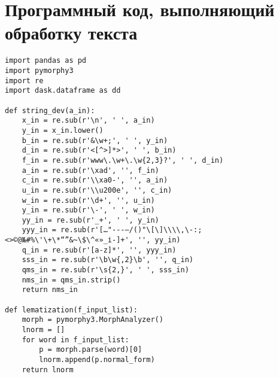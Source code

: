 \documentclass[coursework]{SCWorks}
\begin{document}
\section{Программный код, выполняющий обработку текста}
\label{apx:tokenization}
\begin{verbatim}
import pandas as pd
import pymorphy3
import re
import dask.dataframe as dd

def string_dev(a_in):
    x_in = re.sub(r'\n', ' ', a_in)
    y_in = x_in.lower()
    b_in = re.sub(r'&\w+;', ' ', y_in)
    d_in = re.sub(r'<[^>]*>', ' ', b_in)
    f_in = re.sub(r'www\.\w+\.\w{2,3}?', ' ', d_in)
    a_in = re.sub(r'\xad', '', f_in)
    c_in = re.sub(r'\\xa0-', '', a_in)
    u_in = re.sub(r'\\u200e', '', c_in)
    w_in = re.sub(r'\d+', '', u_in)
    y_in = re.sub(r'\-', ' ', w_in)
    yy_in = re.sub(r'_+', ' ', y_in)
    yyy_in = re.sub(r'[…"---–/()"\[\]\\\\,\-:;<>©@№#%\'\+\*“”&~\$\^«»_і‑]+', '', yy_in)
    q_in = re.sub(r'[a-z]*', '', yyy_in)
    sss_in = re.sub(r'\b\w{,2}\b', '', q_in)
    qms_in = re.sub(r'\s{2,}', ' ', sss_in)
    nms_in = qms_in.strip()
    return nms_in

def lematization(f_input_list):
    morph = pymorphy3.MorphAnalyzer()
    lnorm = []
    for word in f_input_list:
        p = morph.parse(word)[0]
        lnorm.append(p.normal_form)
    return lnorm


\end{verbatim}
\end{document}
